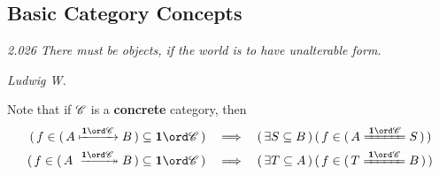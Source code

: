 \subsection{Basic Category Concepts}
\epigraph{\footnotesize \textit{2.026 There must be objects, if the world is to have unalterable form.}}{\footnotesize \textit{Ludwig W.}}

Note that if \(\mathscr{C}\) is a \textbf{concrete} category, then
\begin{align}
  \blk{f\in \col{A \mono{\cc} B} \subseteq \cat{1}{\cc}} &\corres \blk{\exists S\subseteq B}\,\blk{f\in \col{A \iso{\cc} S}} \\
  \blk{f\in \col{A \epi{\cc} B} \subseteq \cat{1}{\cc}} &\corres \blk{\exists T\subseteq A}\,\blk{f\in \col{T \iso{\cc} B}}
\end{align}